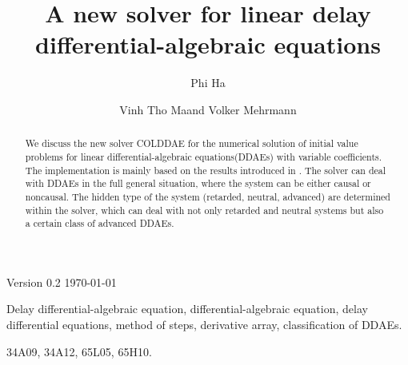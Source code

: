 \documentclass[final,reqno]{siamltex}
\begin{document}
\title{A new solver for linear delay differential-algebraic equations\footnotemark[1]}

\author{Phi Ha\footnotemark[2] \and Vinh Tho Ma\footnotemark[2] and Volker Mehrmann\footnotemark[2]}

\renewcommand{\thefootnote}{\fnsymbol{footnote}}


\maketitle

\newcommand{\thedate}{Version 0.2 \quad \today}

\begin{center}
\thedate
\end{center}

\vskip 0.2cm

\begin{abstract}
We discuss the new solver COLDDAE for the numerical solution of initial value problems for linear differential-algebraic equations(DDAEs) with variable coefficients. The implementation is mainly 
based on the results introduced in \cite{HaM14}. The solver can deal with DDAEs in the full general situation, where the system can be either causal or noncausal. 
The hidden type of the system (retarded, neutral, advanced) are determined within the solver, which can deal with not only retarded and neutral systems but also a 
certain class of advanced DDAEs.
\end{abstract}

\begin{keywords} Delay differential-algebraic equation, differential-algebraic equation, delay differential equations, method of steps, derivative array, classification of DDAEs.
\end{keywords}

\begin{AMS}
34A09, 34A12, 65L05, 65H10.
\end{AMS}

\pagestyle{myheadings}
\thispagestyle{plain}
\end{document}
